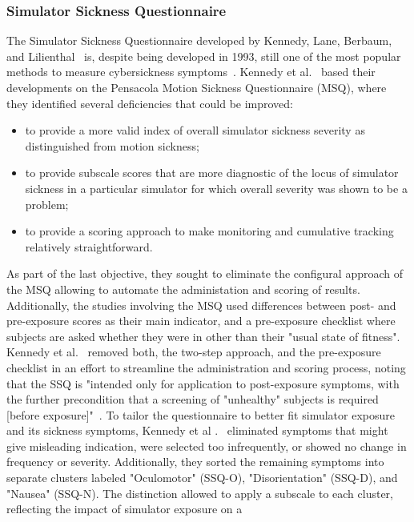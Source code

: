 \subsubsection{Simulator Sickness Questionnaire}\label{subsubsec:simulator-sickness-questionnaire}

The Simulator Sickness Questionnaire developed by Kennedy, Lane, Berbaum, and Lilienthal~\cite{Kennedy1993} is,
despite being developed in 1993, still one of the most popular methods to measure cybersickness
symptoms~\cite{Saredakis2020}.
Kennedy et al.~\cite{Kennedy1993} based their developments on the Pensacola Motion Sickness Questionnaire (MSQ),
where they identified several deficiencies that could be improved:
\begin{itemize}
    \item to provide a more valid index of overall simulator sickness severity as distinguished from motion sickness;
    \item to provide subscale scores that are more diagnostic of the locus of simulator sickness in a particular
    simulator for which overall severity was shown to be a problem;
    \item to provide a scoring approach to make monitoring and cumulative tracking relatively straightforward.
\end{itemize}
As part of the last objective, they sought to eliminate the configural approach of the MSQ allowing to automate the
administation and scoring of results.
Additionally, the studies involving the MSQ used differences between post- and pre-exposure scores as their main
indicator, and a pre-exposure checklist where subjects are asked whether they were in other than their "usual state 
of fitness".
Kennedy et al.~\cite{Kennedy1993} removed both, the two-step approach, and the pre-exposure checklist in an effort to
streamline the administration and scoring process, noting that the SSQ is "intended only for application to 
post-exposure symptoms, with the further precondition that a screening of "unhealthy" subjects is required [before exposure]"~\cite[p.
207]{Kennedy1993}.
To tailor the questionnaire to better fit simulator exposure and its sickness symptoms, Kennedy et al
.~\cite{Kennedy1993} eliminated symptoms that might give misleading indication, were selected too infrequently, or
showed no change in frequency or severity.
Additionally, they sorted the remaining symptoms into separate clusters labeled "Oculomotor" (SSQ-O),
"Disorientation" (SSQ-D), and "Nausea" (SSQ-N).
The distinction allowed to apply a subscale to each cluster, reflecting the impact of simulator exposure on a
